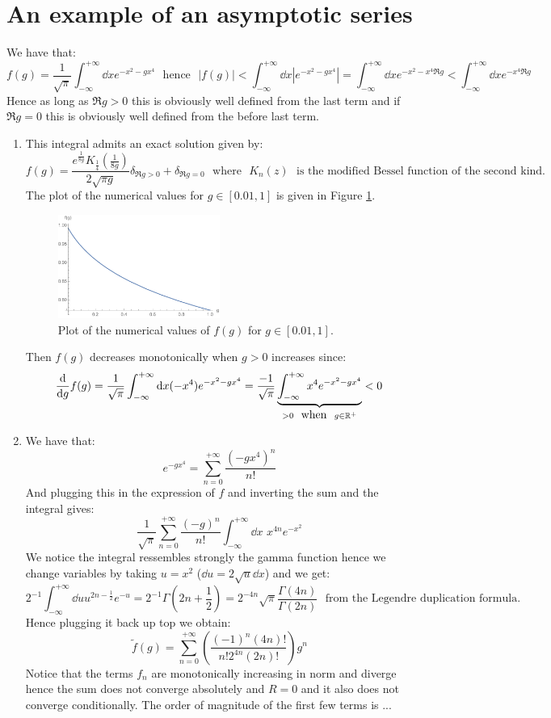 \documentclass[10pt,a4paper]{article}
\begin{document}
\section[Exercise]{An example of an asymptotic series}

We have that:
\[
f(g) = \frac{1}{\sqrt{\pi}} \int_{-\infty}^{+\infty} \dd x e^{-x^2 - g x^4} \mbox{~~hence~~} |f(g)| < \int_{-\infty}^{+\infty} \dd x | e^{-x^2 - g x^4}| = \int_{-\infty}^{+\infty} \dd x e^{-x^2 - x^4 \Re g} < \int_{-\infty}^{+\infty} \dd x e^{-x^4 \Re g}
\]
Hence as long as $\Re g > 0$ this is obviously well defined from the last term and if $\Re g = 0$ this is obviously well defined from the before last term.

\begin{enumerate}
\item This integral admits an exact solution given by:
\[
f(g) = \frac{e^{\frac{1}{8g}} K_{\frac{1}{4}}(\frac{1}{8g})}{2\sqrt{\pi g}} \delta_{\Re g > 0} + \delta_{\Re g = 0} \mbox{~~where~~} K_n(z) \mbox{~~is the modified Bessel function of the second kind.}
\]
The plot of the numerical values for $g \in [0.01, 1]$ is given in Figure \ref{integral:1}.
\begin{figure}
\centering
\includegraphics[width = 0.5\textwidth]{integral1}
\caption{Plot of the numerical values of $f(g)$ for $g \in [0.01, 1]$. }\label{integral:1}
\end{figure}
Then $f(g)$ decreases monotonically when $g > 0$ increases since:
\[
\dv{}{g} f(g) = \frac{1}{\sqrt{\pi}} \int_{-\infty}^{+\infty} \dd x (-x^4) e^{-x^2 - g x^4} = \frac{-1}{\sqrt{\pi}} \underbrace{\int_{-\infty}^{+\infty} x^4 e^{-x^2 - g x^4}}_{ > 0 \mbox{~~when~~} g \in \mathbb{R}^+} < 0
\]

\item We have that:
\[
e^{-g x^4} = \sum_{n = 0}^{+\infty} \frac{(-gx^4)^n}{n!}
\]
And plugging this in the expression of $f$ and inverting the sum and the integral gives:
\[
\frac{1}{\sqrt{\pi}} \sum_{n = 0}^{+\infty} \frac{(-g)^n}{n!} \int_{-\infty}^{+\infty} \dd x\,\, x^{4n} e^{-x^2}
\]
We notice the integral ressembles strongly the gamma function hence we change variables by taking $u = x^2$ ($\dd u = 2 \sqrt{u} \dd x$) and we get:
\[
2^{-1} \int_{-\infty}^{+\infty} \dd u u^{2n - \frac{1}{2}} e^{-u} = 2^{-1} \Gamma(2n + \frac{1}{2}) = 2^{-4n} \sqrt{\pi} \frac{\Gamma(4n)}{\Gamma(2n)} \mbox{~~from the Legendre duplication formula.}
\]
Hence plugging it back up top we obtain:
\[
\tilde{f}(g) = \sum_{n = 0}^{+\infty} \left( \frac{(-1)^n(4n)!}{n! 2^{4n} (2n)!} \right) g^n
\]
Notice that the terms $f_n$ are monotonically increasing in norm and diverge hence the sum does not converge absolutely and $R = 0$ and it also does not converge conditionally. The order of magnitude of the first few terms is ...


\end{enumerate}
\end{document}
